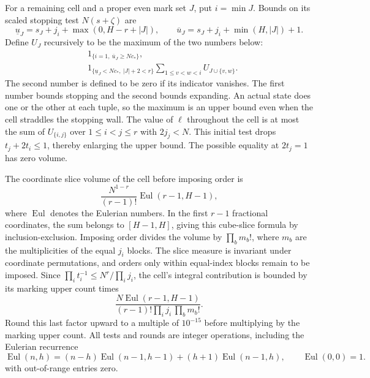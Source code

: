 \documentclass[11pt,a4paper]{article}
\theoremstyle{paperplain}
\numberwithin{equation}{section}
\begin{document}
For a remaining cell and a proper even mark set \(J\),
put \(i=\min J\). Bounds on its scaled stopping test
\(N(s+\zeta)\) are
\[
  \underline u_J=s_J+j_i+\max(0,H-r+|J|),\qquad
  \overline u_J=s_J+j_i+\min(H,|J|)+1 .
\]
Define \(U_J\) recursively to be the maximum of the two
numbers below:
\[
 \begin{aligned}
 &1_{\{i=1,\ \overline u_J\ge Nc_*\}},\\
 &1_{\{\underline u_J<Nc_*,\ |J|+2<r\}}
       \sum_{1\le v<w<i} U_{J\cup\{v,w\}} .
 \end{aligned}
\]
The second number is defined to be zero if its indicator
vanishes. The first number bounds stopping and the second
bounds expanding. An actual state does one or the other
at each tuple, so the maximum is an upper bound even when
the cell straddles the stopping wall. The value of
\(\ell\) throughout the cell is at most the sum of
\(U_{\{i,j\}}\) over \(1\le i<j\le r\) with \(2j_j<N\).
This initial test drops \(t_j+2t_i\le1\), thereby
enlarging the upper bound. The possible equality at \(2t_j=1\)
has zero volume.

The coordinate slice volume of the cell before imposing
order is
\[
 \frac{N^{1-r}}{(r-1)!}\operatorname{Eul}(r-1,H-1),
\]
where \(\operatorname{Eul}\) denotes the Eulerian numbers. In the first
\(r-1\) fractional coordinates, the sum belongs to
\([H-1,H]\), giving this cube-slice formula by
inclusion-exclusion. Imposing order divides the volume by
\(\prod_b m_b!\), where \(m_b\) are the multiplicities of
the equal \(j_i\) blocks. The slice measure is invariant
under coordinate permutations, and orders only within
equal-index blocks remain to be imposed. Since
\(\prod_i t_i^{-1}\le N^r/\prod_i j_i\), the cell's
integral contribution is bounded by its marking upper
count times
\[
  \frac{N\operatorname{Eul}(r-1,H-1)}
       {(r-1)!\prod_i j_i\,\prod_b m_b!}.
\]
Round this last factor upward to a multiple of \(10^{-15}\)
before multiplying by the marking upper count. All tests
and rounds are integer operations, including the Eulerian
recurrence
\[
 \operatorname{Eul}(n,h)
  =(n-h)\operatorname{Eul}(n-1,h-1)
   +(h+1)\operatorname{Eul}(n-1,h),
 \qquad \operatorname{Eul}(0,0)=1 .
\]
with out-of-range entries zero.
\end{document}
